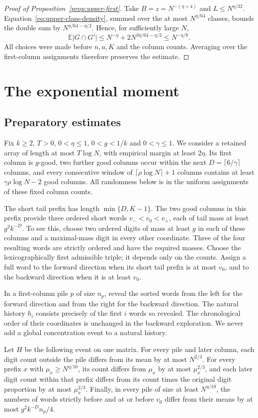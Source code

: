 \documentclass[11pt]{article}
\numberwithin{equation}{section}
\theoremstyle{definition}
\theoremstyle{remark}
\newcommand{\E}{\mathbb E}
\newcommand{\1}{\mathbf 1}
\begin{document}
\begin{proof}[Proof of Proposition~\ref{prop:upper-first}]
Take $B=z=N^{-(\eta+4)}$ and $L\le N^{\eta/32}$.
Equation~\eqref{eq:upper-class-density}, summed over the at most
$N^{\eta/64}$ classes, bounds the double sum by
$N^{\eta/64-\eta/2}$. Hence, for sufficiently large $N$,
\[
 \E|G\cap G'|\le
 N^{-\eta}+2N^{3\eta/64-\eta/2}\le N^{-\eta/8}.
\]
All choices were made before $n,a,K$ and the column counts. Averaging
over the first-column assignments therefore preserves the estimate.
\end{proof}

\section{The exponential moment}\label{sec:upper-exponential}
\subsection{Preparatory estimates}
Fix $k\ge2$, $T>0$, $0<\eta\le1$, $0<g<1/k$ and
$0<\gamma\le1$. We consider a retained array of length at most
$T\log N$, with empirical margin at least $2\eta$. Its first column
is $g$-good, two further good columns occur within the next
$D=\lceil6/\gamma\rceil$ columns, and every consecutive window of
$\lceil\rho\log N\rceil+1$ columns contains at least
$\gamma\rho\log N-2$ good columns. All randomness below is in the
uniform assignments of these fixed column counts.

The short tail prefix has length $\min\{D,K-1\}$. The two good
columns in this prefix provide three
ordered short words $v_-<v_0<v_+$, each of tail mass at least
$g^2k^{-D}$. To see this, choose two ordered digits of mass at least
$g$ in each of these columns and a maximal-mass digit in every other
coordinate. Three of the four resulting words are strictly ordered
and have the required masses. Choose the lexicographically first
admissible triple; it depends only on the counts. Assign a full word
to the forward direction when its short tail prefix is at most $v_0$,
and to the backward direction when it is at least $v_0$.

In a first-column pile $p$ of size $n_p$, reveal the sorted words
from the left for the forward direction and from the right for the
backward direction. The natural history $h_i$ consists precisely of
the first $i$ words so revealed. The chronological order of their
coordinates is unchanged in the backward exploration. We never add
a global concentration event to a natural history.

Let $H$ be the following event on one matrix. For every pile and
later column, each digit count outside the pile differs from its
mean by at most $N^{2/3}$. For every prefix $x$ with
$\mu_x\ge N^{\eta/10}$, its count differs from $\mu_x$ by at most
$\mu_x^{2/3}$, and each later digit count within that prefix differs
from its count times the original digit proportion by at most
$\mu_x^{2/3}$. Finally, in every pile of size at least $N^{\eta/10}$,
the numbers of words strictly before and at or before $v_0$ differ
from their means by at most $g^2k^{-D}n_p/4$.
\end{document}
